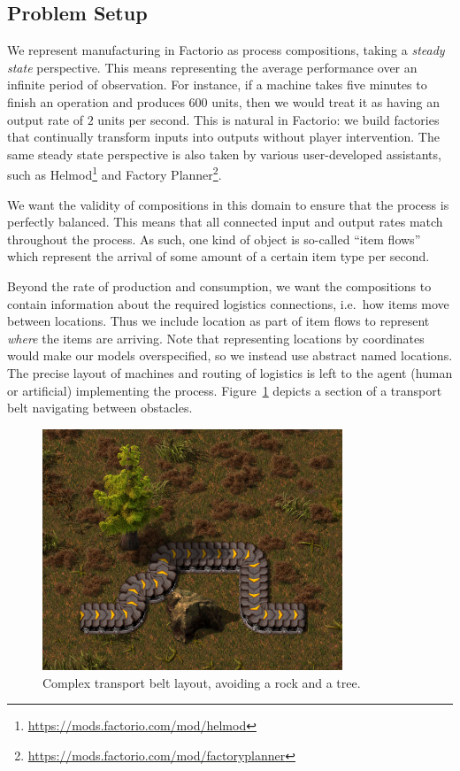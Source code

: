 \documentclass[class=smolathesis,crop=false]{standalone}
\begin{document}
\subsection{Problem Setup}
\label{sec:cases/factorio/setting}

We represent manufacturing in Factorio as process compositions, taking a \emph{steady state} perspective.
This means representing the average performance over an infinite period of observation.
For instance, if a machine takes five minutes to finish an operation and produces $600$ units, then we would treat it as having an output rate of $2$ units per second.
This is natural in Factorio: we build factories that continually transform inputs into outputs without player intervention.
The same steady state perspective is also taken by various user-developed assistants, such as Helmod\footnote{\url{https://mods.factorio.com/mod/helmod}} and Factory Planner\footnote{\url{https://mods.factorio.com/mod/factoryplanner}}.

We want the validity of compositions in this domain to ensure that the process is perfectly balanced.
This means that all connected input and output rates match throughout the process.
As such, one kind of object is so-called ``item flows'' which represent the arrival of some amount of a certain item type per second.

Beyond the rate of production and consumption, we want the compositions to contain information about the required logistics connections, i.e.\ how items move between locations.
Thus we include location as part of item flows to represent \emph{where} the items are arriving.
Note that representing locations by coordinates would make our models overspecified, so we instead use abstract named locations.
The precise layout of machines and routing of logistics is left to the agent (human or artificial) implementing the process.
Figure~\ref{fig:factorio_complex-belt} depicts a section of a transport belt navigating between obstacles.

\begin{figure}[p]
  \centering
  \includegraphics[width=0.8\textwidth]{img/factorio_complex-belt.png}
  \caption{Complex transport belt layout, avoiding a rock and a tree.}
  \label{fig:factorio_complex-belt}
\end{figure}
\end{document}
